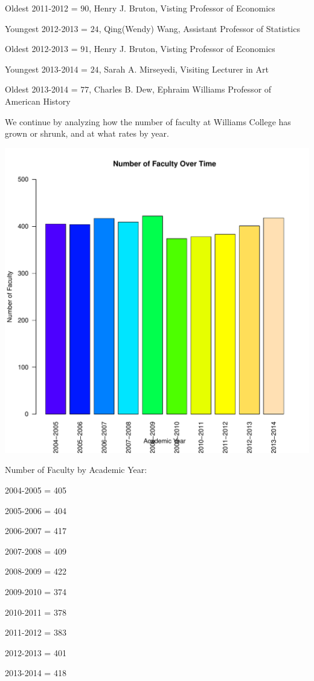 \documentclass[12pt,a4paper]{article}\usepackage[]{graphicx}\usepackage[]{color}
\makeatletter
\def\maxwidth{ %
  \ifdim\Gin@nat@width>\linewidth
    \linewidth
  \else
    \Gin@nat@width
  \fi
}
\newenvironment{knitrout}{}{} %
\theoremstyle{definition}
\makeatother
\begin{document}
\bigskip
Oldest 2011-2012 = \(90\), Henry J. Bruton, Visting Professor of Economics

\bigskip
Youngest 2012-2013 = \(24\), Qing(Wendy) Wang, Assistant Professor of Statistics

\bigskip
Oldest 2012-2013 = \(91\), Henry J. Bruton, Visting Professor of Economics

\bigskip
Youngest 2013-2014 = \(24\), Sarah A. Mirseyedi, Visiting Lecturer in Art

\bigskip
Oldest 2013-2014 = \(77\), Charles B. Dew, Ephraim Williams Professor of American History

\bigskip
We continue by analyzing how the number of faculty at Williams College has grown or shrunk, and at what rates by year.


\begin{knitrout}
\color{fgcolor}
\includegraphics[width=\maxwidth]{figure/unnamed-chunk-7-1} 

\end{knitrout}


\begin{center}
Number of Faculty by Academic Year:

2004-2005 = 405

2005-2006 = 404

2006-2007 = 417

2007-2008 = 409

2008-2009 = 422

2009-2010 = 374

2010-2011 = 378

2011-2012 = 383

2012-2013 = 401

2013-2014 = 418
\end{center}
\end{document}
